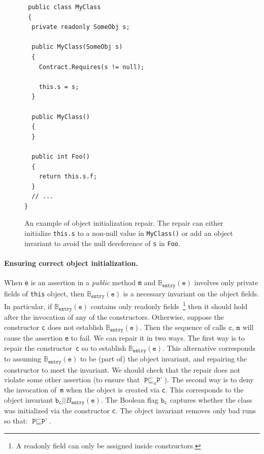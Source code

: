 \documentclass[10pt]{sigplanconf}
\newcommand{\labelFig}[1]{\label{fig:#1}}
\newcommand{\code}[1]{\texttt{#1}}
\begin{document}
\begin{figure}[t]
\begin{lstlisting}
 public class MyClass
 {
  private readonly SomeObj s;

  public MyClass(SomeObj s)
  {
    Contract.Requires(s != null);

    this.s = s;
  }

  public MyClass()
  {
  }
 
  public int Foo()
  {
    return this.s.f;
  }
  // ...
}
\end{lstlisting}
\caption{An example of object initialization repair. The repair can either initialize \code{this.s} to a non-null value in \code{MyClass()} or add an object invariant to avoid the null dereference of \code{s} in \code{Foo}.} 
\labelFig{objectinvariant}
\end{figure}


\paragraph{Ensuring correct object initialization.}
When \code{e} is an assertion in a \emph{public} method  \code{m} and  $\mathbb{B}_\code{entry}(\code{e})$ involves only private fields of \code{this} object, then $\mathbb{B}_\code{entry}(\code{e})$ is a necessary invariant on the object fields.
In particular, if $\mathbb{B}_\code{entry}(\code{e})$  contains only readonly fields~\footnote{A readonly field can only be assigned inside constructors.} then it should hold after the invocation of any of the constructors.
Otherwise, suppose the constructor \code{c} does not establish  $\mathbb{B}_\code{entry}(\code{e})$. 
Then the sequence of calls $\code{c}$, $\code{m}$ will cause the assertion \code{e} to fail.
We can repair it in two ways.
The first way is to repair the constructor~\code{c} so to establish $\mathbb{B}_\code{entry}(\code{e})$.
This alternative corresponds to assuming $\mathbb{B}_\code{entry}(\code{e})$ to be (part of) the object invariant, and repairing the constructor to meet the invariant.
We should check that the repair does not violate some other assertion (to ensure that $\code{P} \sqsubseteq_a \code{P'}$).
The second way is to deny the invocation of~\code{m} when the object is created via \code{c}.
This corresponds to the object invariant $\code{b}_\code{c} || {B}_\code{entry}(\code{e})$.
The Boolean flag $\code{b}_\code{c}$ captures whether the class was initialized via the  constructor \code{c}.
The object invariant removes only bad runs so that: $\code{P} \sqsubseteq \code{P'}$.
\end{document}
